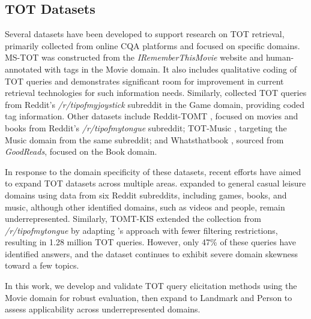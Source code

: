 \subsection{TOT Datasets}
Several datasets have been developed to support research on TOT retrieval, primarily collected from online CQA platforms and focused on specific domains. MS-TOT \cite{arguello-movie-identification} was constructed from the \textit{IRememberThisMovie} website and human-annotated with tags in the Movie domain. It also includes qualitative coding of TOT queries and demonstrates significant room for improvement in current retrieval technologies for such information needs. Similarly, \citet{gameTOT} collected TOT queries from Reddit's \textit{/r/tipofmyjoystick} subreddit in the Game domain, providing coded tag information. Other datasets include Reddit-TOMT \cite{Bhargav-2022-wsdm}, focused on movies and books from Reddit's \textit{/r/tipofmytongue} subreddit; TOT-Music \cite{Bhargav23MusicTOT}, targeting the Music domain from the same subreddit; and Whatsthatbook \cite{lin-etal-2023-whatsthatbook}, sourced from \textit{GoodReads}, focused on the Book domain.



In response to the domain specificity of these datasets, recent efforts have aimed to expand TOT datasets across multiple areas. \citet{Meier21-complex-reddit} expanded to general casual leisure domains using data from six Reddit subreddits, including games, books, and music, although other identified domains, such as videos and people, remain underrepresented. Similarly, TOMT-KIS \cite{frobe2023-performance-pred} extended the collection from \textit{/r/tipofmytongue} by adapting \citet{Bhargav-2022-wsdm}'s approach with fewer filtering restrictions, resulting in 1.28 million TOT queries. However, only 47\% of these queries have identified answers, and the dataset continues to exhibit severe domain skewness toward a few topics. 


In this work, we develop and validate TOT query elicitation methods using the Movie domain for robust evaluation, then expand to Landmark and Person to assess applicability across underrepresented domains.